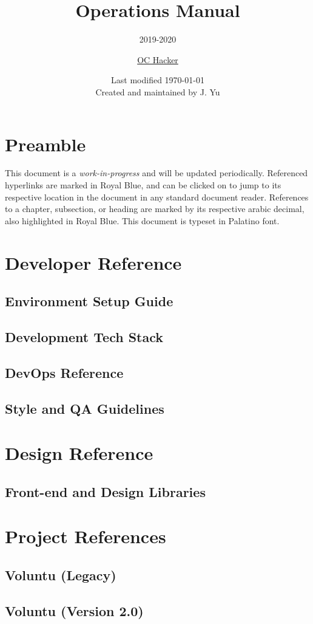 \documentclass[twoside,11pt,letterpaper,abstracton]{scrartcl}
\title{Operations Manual}
\subtitle{2019-2020}
\author{\normalsize{\href{https://ochacker.org}{OC Hacker}}}
\date{\normalsize{Last modified \today \\ \small{Created and maintained by J. Yu}}}
\begin{document}
\maketitle

\section*{Preamble}

This document is a \emph{work-in-progress} and will be updated periodically. Referenced hyperlinks are marked in \color{RoyalBlue} Royal Blue\color{Black}, and can be clicked on to jump to its respective location in the document in any standard document reader. References to a chapter, subsection, or heading are marked by its respective arabic decimal, also highlighted in \color{RoyalBlue} Royal Blue\color{Black}. This document is typeset in Palatino font.

\tableofcontents

\newpage

\section{Developer Reference}

\subsection{Environment Setup Guide}

\subsection{Development Tech Stack}

\subsection{DevOps Reference}

\subsection{Style and QA Guidelines}

\newpage

\section{Design Reference}

\subsection{Front-end and Design Libraries}

\newpage

\section{Project References}

\subsection{Voluntu (Legacy)}

\subsection{Voluntu (Version 2.0)}
\end{document}
